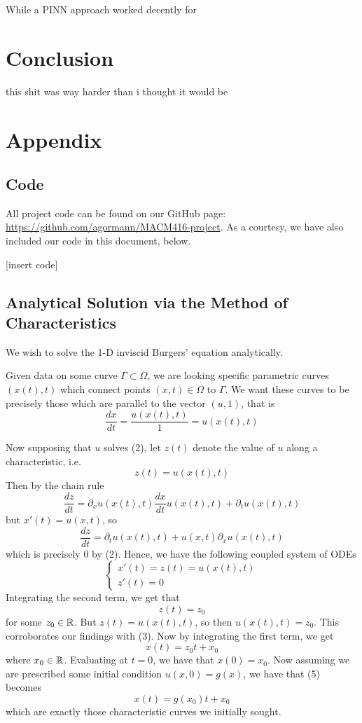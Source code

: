 \documentclass{myproject}
\begin{document}
While a PINN approach worked decently for 

\section{Conclusion}

this shit was way harder than i thought it would be

\newpage
\appendix
\section{Appendix}
\subsection{Code}

All project code can be found on our GitHub page: \url{https://github.com/agormann/MACM416-project}. As a courtesy, we have also included our code in this document, below.

[insert code]

\subsection{Analytical Solution via the Method of Characteristics}

We wish to solve the 1-D inviscid Burgers' equation analytically.

Given data on some curve $ \Gamma \subset \overline{\Omega} $, we are looking specific parametric curves $ (x(t), t) $ which connect points $(x, t) \in \Omega$ to $ \Gamma $. We want these curves to be precisely those which are parallel to the vector $(u, 1)$, that is
\[
    \frac{dx}{dt} = \frac{u(x(t), t)}{1} = u(x(t), t)
\]

Now supposing that $u$ solves (2), let $z(t)$ denote the value of $u$ along a characteristic, i.e. 
\[
    z(t) = u(x(t), t)
\]
Then by the chain rule
\[
    \frac{dz}{dt} = \partial_x u(x(t), t) \frac{dx}{dt}u(x(t), t) + \partial_t u(x(t), t)
\]
but $ x'(t) = u(x,t) $, so
\[
    \frac{dz}{dt} = \partial_t u(x(t), t) + u(x,t)\partial_x u(x(t), t)
\]
which is precisely 0 by (2). Hence, we have the following coupled system of ODEs
\begin{equation}
    \begin{cases}
        x'(t) = z(t) = u(x(t), t) \\
        z'(t) = 0
    \end{cases}
\end{equation}
Integrating the second term, we get that
\[
    z(t) = z_0
\]
for some $ z_0 \in \operatorname{\mathbb{R}} $. But $z(t) = u(x(t), t)$, so then $u(x(t), t) = z_0$. This corroborates our findings with (3). Now by integrating the first term, we get
\begin{equation}
    x(t) = z_0t + x_0
\end{equation}
where $ x_0 \in \operatorname{\mathbb{R}} $. Evaluating at $t=0$, we have that $x(0) = x_0$. Now assuming we are prescribed some initial condition $u(x,0) = g(x)$, we have that (5) becomes
\begin{equation}
    x(t) = g(x_0)t + x_0
\end{equation}
which are exactly those characteristic curves we initially sought.

\nocite{choksi2022}
\nocite{iserles2009}
\nocite{leveque1992}
\nocite{leveque2002}
\printbibliography
\end{document}
